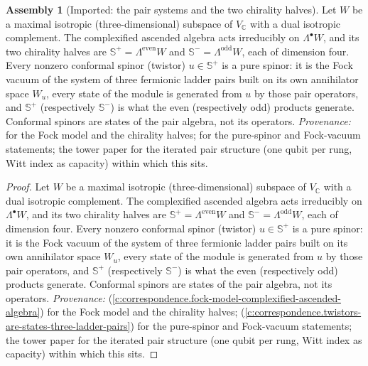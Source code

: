 \documentclass[11pt]{article}
\theoremstyle{definition}
\newtheorem{assembled}[theorem]{Assembly}
\theoremstyle{plain}
\newcommand{\changedmark}[2]{\marginpar{\raggedright\scriptsize\color{#1}#2}}
\providecommand{\C}{}\renewcommand{\C}{\mathbb{C}}
\providecommand{\CS}{}\renewcommand{\CS}{{\mathbb{S}^{+}}}
\providecommand{\CSm}{}\renewcommand{\CSm}{{\mathbb{S}^{-}}}
\begin{document}
\begin{assembled}[Imported: the pair systems and the two chirality halves]\label{c:standard-model.imported-pair-systems-two-chirality-halves}
\changedmark{gray}{reworded}
Let $W$ be a maximal isotropic (three-dimensional) subspace of $V_{\C}$ with a dual isotropic complement. The complexified ascended algebra acts irreducibly on $\Lambda^{\bullet}W$, and its two chirality halves are $\CS = \Lambda^{\mathrm{even}}W$ and $\CSm = \Lambda^{\mathrm{odd}}W$, each of dimension four. Every nonzero conformal spinor (twistor) $u \in \CS$ is a pure spinor: it is the Fock vacuum of the system of three fermionic ladder pairs built on its own annihilator space $W_{u}$, every state of the module is generated from $u$ by those pair operators, and $\CS$ (respectively $\CSm$) is what the even (respectively odd) products generate. Conformal spinors are states of the pair algebra, not its operators. \emph{Provenance:} \cite[Thm.~3.1]{ButlerT9} for the Fock model and the chirality halves; \cite[Thm.~5.3]{ButlerT9} for the pure-spinor and Fock-vacuum statements; the tower paper \cite[Thms.~4.2, 4.3]{ButlerT3} for the iterated pair structure (one qubit per rung, Witt index as capacity) within which this sits.
\end{assembled}
\begin{proof}
Let $W$ be a maximal isotropic (three-dimensional) subspace of $V_{\C}$ with a dual isotropic complement. The complexified ascended algebra acts irreducibly on $\Lambda^{\bullet}W$, and its two chirality halves are $\CS = \Lambda^{\mathrm{even}}W$ and $\CSm = \Lambda^{\mathrm{odd}}W$, each of dimension four. Every nonzero conformal spinor (twistor) $u \in \CS$ is a pure spinor: it is the Fock vacuum of the system of three fermionic ladder pairs built on its own annihilator space $W_{u}$, every state of the module is generated from $u$ by those pair operators, and $\CS$ (respectively $\CSm$) is what the even (respectively odd) products generate. Conformal spinors are states of the pair algebra, not its operators. \emph{Provenance:} \cite[Thm.~3.1]{ButlerT9} (\ref{c:correspondence.fock-model-complexified-ascended-algebra}) for the Fock model and the chirality halves; \cite[Thm.~5.3]{ButlerT9} (\ref{c:correspondence.twistors-are-states-three-ladder-pairs}) for the pure-spinor and Fock-vacuum statements; the tower paper \cite[Thms.~4.2, 4.3]{ButlerT3} for the iterated pair structure (one qubit per rung, Witt index as capacity) within which this sits.

\end{proof}
\end{document}
